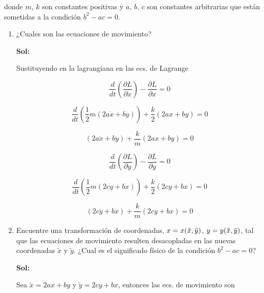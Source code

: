 \documentclass[12pt,a4paper]{article}
\begin{document}
\begin{enumerate}
donde $m$, $k$ son constantes positivas y $a$, $b$, $c$ son constantes arbitrarias que están sometidas a la condición $b^2 - ac = 0$.

\begin{enumerate}
    \item ¿Cuales son las ecuaciones de movimiento?
    
    \textbf{Sol:}
    
    Sustituyendo en la lagrangiana en las ecs. de Lagrange
    
    \begin{equation*}
        \frac{d}{dt}\left(\frac{\partial L}{\partial \dot{x}}\right) - \frac{\partial L}{\partial x} = 0
    \end{equation*}
    
    \begin{equation*}
        \frac{d}{dt}\left(\frac{1}{2}m (2a\dot{x}+b\dot{y})\right) + \frac{k}{2} (2ax + by)  = 0
    \end{equation*}
    
    \begin{equation*}
        (2a\ddot{x}+b\ddot{y}) + \frac{k}{m} (2ax + by)  = 0
    \end{equation*}
    
    \begin{equation*}
        \frac{d}{dt}\left(\frac{\partial L}{\partial \dot{y}}\right) - \frac{\partial L}{\partial y} = 0
    \end{equation*}
    
    \begin{equation*}
        \frac{d}{dt}\left(\frac{1}{2}m (2c\dot{y}+b\dot{x})\right) + \frac{k}{2} (2cy + bx)  = 0
    \end{equation*}
    
    \begin{equation*}
        (2c\ddot{y}+b\ddot{x}) + \frac{k}{m} (2cy + bx)  = 0
    \end{equation*}
    
    \item Encuentre una transformación de coordenadas, $x = x(\Tilde{x}, \tilde{y})$, $y = y(\Tilde{x}, \tilde{y})$, tal que las ecuaciones de movimiento resulten desacopladas en las nuevas coordenadas $\tilde{x}$ y $\tilde{y}$. ¿Cual es el significado físico de la condición $b^2 -ac = 0 $?
    
    \textbf{Sol:}
    
    Sea $\tilde{x} = 2ax + by $ y $\tilde{y}= 2cy + bx$, entonces las ecs. de movimiento son
    

\end{enumerate}
\end{enumerate}
\end{document}
